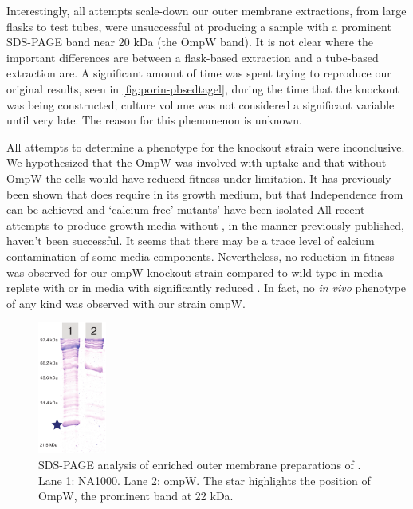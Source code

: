 Interestingly, all attempts scale-down our outer membrane extractions, from large flasks to test tubes, were unsuccessful at producing a sample with a prominent \ac{SDS-PAGE} band near 20 kDa (the OmpW band). It is not clear where the important differences are between a flask-based extraction and a tube-based extraction are. A significant amount of time was spent trying to reproduce our original results, seen in \cref{fig:porin-pbsedtagel}, during the time that the knockout was being constructed; culture volume was not considered a significant variable until very late. The reason for this phenomenon is unknown.

All attempts to determine a phenotype for the knockout strain were inconclusive. We hypothesized that the OmpW was involved with  uptake and that without OmpW the cells would have reduced fitness under  limitation. It has previously been shown that \caulobacter does require  in its growth medium, but that Independence from  can be achieved and  `calcium-free' mutants' have been isolated All recent attempts to produce growth media without , in the manner previously published, haven't been successful. It seems that there may be a trace level of calcium contamination of some media components. Nevertheless, no reduction in fitness was observed for our ompW knockout strain compared to wild-type in media replete with  or in media with significantly reduced . In fact, no \textit{in vivo} phenotype of any kind was observed with our strain \caulobacter \del ompW.

\begin{figure}[htb]
  	\begin{center}
   		\includegraphics[width=0.2\textwidth]{porin_chapter/img/Fig-knockout.pdf}
   	\end{center}
   	\caption[\ac{SDS-PAGE} of \caulobacter \del ompW]{\ac{SDS-PAGE} analysis of enriched outer membrane preparations of \caulobacter. Lane 1: \caulobacter NA1000. Lane 2: \caulobacter  \del ompW. The star highlights the position of OmpW, the prominent band at 22 kDa. 
   	}
   	\label{fig:porinknockout}
\end{figure}   

